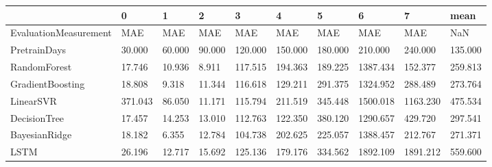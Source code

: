 \begin{tabular}{llllllllll}
\toprule
{} &       0 &      1 &      2 &       3 &       4 &       5 &        6 &        7 &    mean \\
\midrule
EvaluationMeasurement &     MAE &    MAE &    MAE &     MAE &     MAE &     MAE &      MAE &      MAE &     NaN \\
PretrainDays          &  30.000 & 60.000 & 90.000 & 120.000 & 150.000 & 180.000 &  210.000 &  240.000 & 135.000 \\
RandomForest          &  17.746 & 10.936 &  8.911 & 117.515 & 194.363 & 189.225 & 1387.434 &  152.377 & 259.813 \\
GradientBoosting      &  18.808 &  9.318 & 11.344 & 116.618 & 129.211 & 291.375 & 1324.952 &  288.489 & 273.764 \\
LinearSVR             & 371.043 & 86.050 & 11.171 & 115.794 & 211.519 & 345.448 & 1500.018 & 1163.230 & 475.534 \\
DecisionTree          &  17.457 & 14.253 & 13.010 & 112.763 & 122.350 & 380.120 & 1290.657 &  429.720 & 297.541 \\
BayesianRidge         &  18.182 &  6.355 & 12.784 & 104.738 & 202.625 & 225.057 & 1388.457 &  212.767 & 271.371 \\
LSTM                  &  26.196 & 12.717 & 15.692 & 125.136 & 179.176 & 334.562 & 1892.109 & 1891.212 & 559.600 \\
\bottomrule
\end{tabular}
